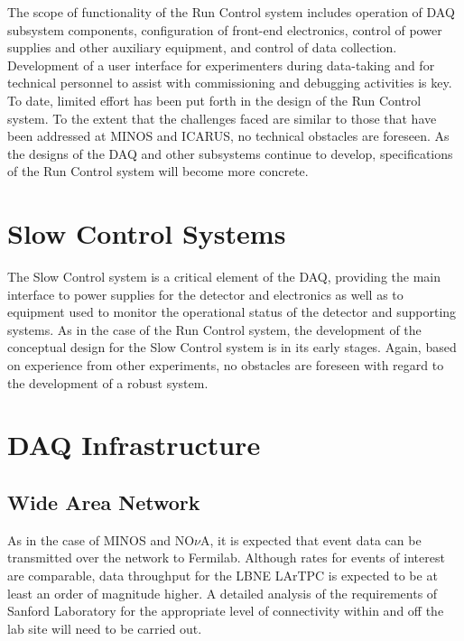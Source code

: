 The scope of 
functionality of the Run Control system includes operation of DAQ 
subsystem components, configuration 
of front-end electronics, control of power supplies and other auxiliary 
equipment, and control of data collection.  Development of a 
user interface for experimenters during data-taking and for technical 
personnel to assist with commissioning and debugging activities is key.  To date, 
limited effort has been put forth in the design of the Run Control system.
To the extent that the challenges faced are similar to those that have 
been addressed at MINOS and ICARUS, no technical obstacles are foreseen.  
As the designs of the DAQ and other subsystems continue to develop, 
specifications of the Run Control system will become more concrete.

\section{Slow Control Systems }
\label{sec:v5-trig-slowcontrol}

The Slow Control system is a critical element of the DAQ, providing the 
main interface to power supplies for the detector and electronics as well  
as to equipment used to monitor the operational status of the detector and 
supporting systems.  As in the case of the Run Control system, the 
development of the conceptual design for the Slow Control system is in 
its early stages.  Again, based on experience from other experiments, 
no obstacles are foreseen with regard to the development of a robust 
system.

\section{DAQ Infrastructure }
\label{sec:v5-trig-infrastructure}


\subsection{Wide Area Network}

As in the case of MINOS and NO$\nu$A, it is expected that event data can be 
transmitted over the network to Fermilab.  Although rates for events of 
interest are comparable, data throughput for the LBNE LArTPC is 
expected to be at least an order of magnitude higher.  A detailed 
analysis of the requirements of Sanford Laboratory for the appropriate level of 
connectivity within and off the lab site will need to be carried out.

